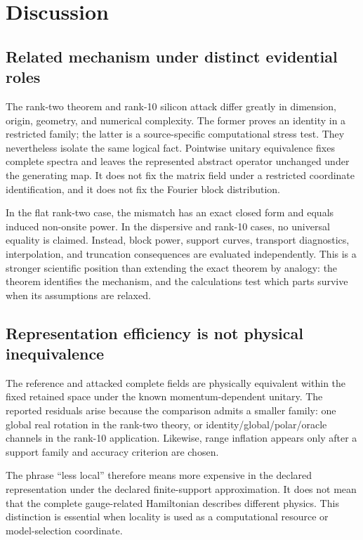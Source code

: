 \documentclass[11pt]{article}
\theoremstyle{definition}
\begin{document}
\clearpage
\section{Discussion}

\subsection{Related mechanism under distinct evidential roles}

The rank-two theorem and rank-10 silicon attack differ greatly in dimension, origin,
geometry, and numerical complexity.  The former proves an identity in a restricted
family; the latter is a source-specific computational stress test.  They nevertheless
isolate the same logical fact.  Pointwise
unitary equivalence fixes complete spectra and leaves the represented abstract operator
unchanged under the generating map.  It does not fix the matrix field under a restricted
coordinate identification, and it does not fix the Fourier block distribution.

In the flat rank-two case, the mismatch has an exact closed form and equals induced
non-onsite power.  In the dispersive and rank-10 cases, no universal equality is claimed.
Instead, block power, support curves, transport diagnostics, interpolation, and
truncation consequences are evaluated independently.  This is a stronger scientific
position than extending the exact theorem by analogy: the theorem identifies the
mechanism, and the calculations test which parts survive when its assumptions are
relaxed.

\subsection{Representation efficiency is not physical inequivalence}

The reference and attacked complete fields are physically equivalent within the fixed
retained space under the known momentum-dependent unitary.  The reported residuals arise
because the comparison admits a smaller family: one global real rotation in the
rank-two theory, or identity/global/polar/oracle channels in the rank-10 application.
Likewise, range inflation appears only after a support family and accuracy criterion are
chosen.

The phrase ``less local'' therefore means more expensive in the declared representation
under the declared finite-support approximation.  It does not mean that the complete
gauge-related Hamiltonian describes different physics.  This distinction is essential
when locality is used as a computational resource or model-selection coordinate.
\end{document}
